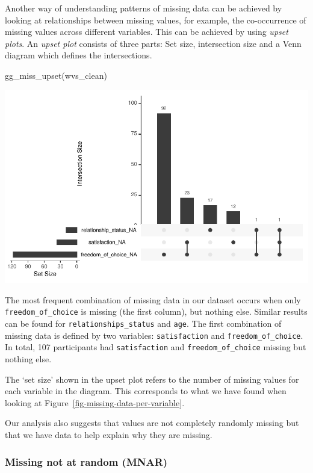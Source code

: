 \documentclass[
  letterpaper,
]{krantz}
\makeatletter
\newenvironment{Shaded}{\begin{snugshade}}{\end{snugshade}}
\newcommand{\FunctionTok}[1]{\textcolor[rgb]{0.28,0.35,0.67}{#1}}
\newcommand{\NormalTok}[1]{\textcolor[rgb]{0.00,0.23,0.31}{#1}}
\newenvironment{kframe}{%
\medskip{}
\setlength{\fboxsep}{.8em}
 \def\at@end@of@kframe{}%
 \ifinner\ifhmode%
  \def\at@end@of@kframe{\end{minipage}}%
  \begin{minipage}{\columnwidth}%
 \fi\fi%
 \def\FrameCommand##1{\hskip\@totalleftmargin \hskip-\fboxsep
 \colorbox{shadecolor}{##1}\hskip-\fboxsep
     \hskip-\linewidth \hskip-\@totalleftmargin \hskip\columnwidth}%
 \MakeFramed {\advance\hsize-\width
   \@totalleftmargin\z@ \linewidth\hsize
   \@setminipage}}%
 {\par\unskip\endMakeFramed%
 \at@end@of@kframe}
\renewenvironment{Shaded}{\begin{kframe}}{\end{kframe}}
\makeatother
\begin{document}
Another way of understanding patterns of missing data can be achieved by
looking at relationships between missing values, for example, the
co-occurrence of missing values across different variables. This can be
achieved by using \emph{upset plots}. An \emph{upset plot} consists of
three parts: Set size, intersection size and a Venn diagram which
defines the intersections.

\begin{Shaded}
\begin{Highlighting}[]
\FunctionTok{gg\_miss\_upset}\NormalTok{(wvs\_clean)}
\end{Highlighting}
\end{Shaded}

\includegraphics{07_data_wrangling_files/figure-pdf/upset-plot-1.pdf}

The most frequent combination of missing data in our dataset occurs when
only \texttt{freedom\_of\_choice} is missing (the first column), but
nothing else. Similar results can be found for
\texttt{relationships\_status} and \texttt{age}. The first combination
of missing data is defined by two variables: \texttt{satisfaction} and
\texttt{freedom\_of\_choice}. In total, 107 participants had
\texttt{satisfaction} and \texttt{freedom\_of\_choice} missing but
nothing else.

The `set size' shown in the upset plot refers to the number of missing
values for each variable in the diagram. This corresponds to what we
have found when looking at Figure~\ref{fig-missing-data-per-variable}.

Our analysis also suggests that values are not completely randomly
missing but that we have data to help explain why they are missing.

\subsubsection{Missing not at random
(MNAR)}\label{sec-missing-not-at-random-mnar}
\end{document}
